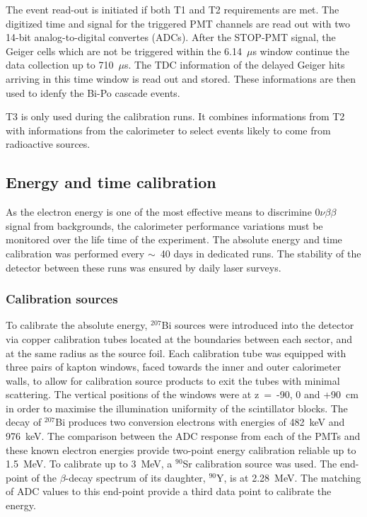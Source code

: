 \documentclass[main.tex]{subfiles}
\begin{document}
\bigskip


\NI The event read-out is initiated if both T1 and T2 requirements are met. The digitized time and signal for the triggered PMT channels are read out with two 14-bit analog-to-digital convertes (ADCs). After the STOP-PMT signal, the Geiger cells which are not be triggered within the 6.14~$\mu$s window continue the data collection up to 710~$\mu$s. The TDC information of the delayed Geiger hits arriving in this time window is read out and stored. These informations are then used to idenfy the Bi-Po cascade events.


\bigskip


\NI T3 is only used during the calibration runs. It combines informations from T2 with informations from the calorimeter to select events likely to come from radioactive sources.




\subsection{Energy and time calibration}


\NI As the electron energy is one of the most effective means to discrimine 0$\nu\beta\beta$ signal from backgrounds, the calorimeter performance variations must be monitored over the life time of the experiment. The absolute energy and time calibration was performed every $\sim$~40 days in dedicated runs. The stability of the detector between these runs was ensured by daily laser surveys.
  

\subsubsection{Calibration sources}


\NI To calibrate the absolute energy, $^{\text{207}}$Bi sources were introduced into the detector via copper calibration tubes located at the boundaries between each sector, and at the same radius as the source foil. Each calibration tube was equipped with three pairs of kapton windows, faced towards the inner and outer calorimeter walls, to allow for calibration source products to exit the tubes with minimal scattering. The vertical positions of the windows were at z~=~-90, 0 and +90~cm in order to maximise the illumination uniformity of the scintillator blocks. The decay of $^{\text{207}}$Bi produces two conversion electrons with energies of 482~keV and 976~keV. The comparison between the ADC response from each of the PMTs and these known electron energies provide two-point energy calibration reliable up to 1.5~MeV. To calibrate up to 3~MeV, a $^{\text{90}}$Sr calibration source was used. The end-point of the $\beta$-decay spectrum of its daughter, $^{\text{90}}$Y, is at 2.28~MeV. The matching of ADC values to this end-point provide a third data point to calibrate the energy.
\end{document}
